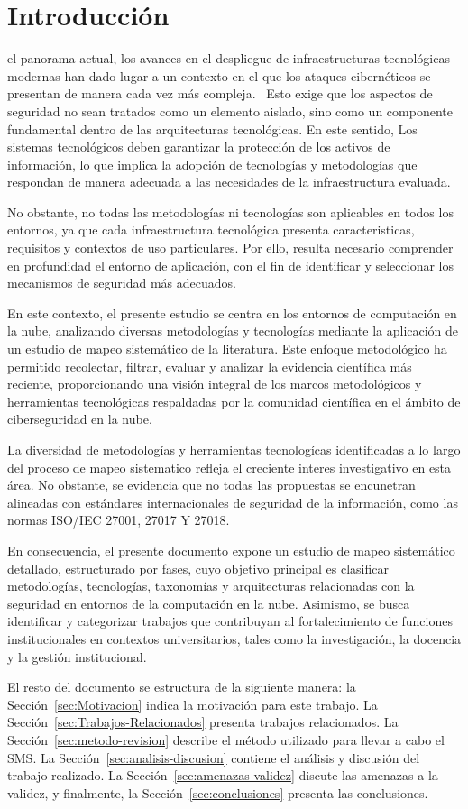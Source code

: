 \section{Introducción}
 el panorama actual, los avances en el despliegue de infraestructuras tecnológicas modernas han dado lugar a un 
contexto en el que los ataques cibernéticos se presentan de manera cada vez más compleja.~\cite{wef2026_complexity} Esto exige que los aspectos de seguridad 
no sean tratados como un elemento aislado, sino como un componente fundamental dentro de las arquitecturas tecnológicas. En este 
sentido, Los sistemas tecnológicos deben garantizar la protección de los activos de información, lo que implica la adopción de 
tecnologías y metodologías que respondan de manera adecuada a las necesidades de la infraestructura evaluada.~\cite{iso27001}

No obstante, no todas las metodologías ni tecnologías son aplicables en todos los entornos, ya que cada infraestructura tecnológica 
presenta caracteristicas, requisitos y contextos de uso particulares. Por ello, resulta necesario comprender en profundidad el 
entorno de aplicación, con el fin de identificar y seleccionar los mecanismos de seguridad más adecuados.~\cite{iso27001}

En este contexto, el presente estudio se centra en los entornos de computación en la nube, analizando diversas metodologías y 
tecnologías mediante la aplicación de un estudio de mapeo sistemático de la literatura. Este enfoque metodológico ha permitido 
recolectar, filtrar, evaluar y analizar la evidencia científica más reciente, proporcionando una visión integral de los marcos 
metodológicos y herramientas tecnológicas respaldadas por la comunidad científica en el ámbito de ciberseguridad en la nube.

La diversidad de metodologías y herramientas tecnologícas identificadas a lo largo del proceso de mapeo sistematico refleja el 
creciente interes investigativo en esta área. No obstante, se evidencia que no todas las propuestas se encunetran alineadas con 
estándares internacionales de seguridad de la información, como las normas ISO/IEC 27001, 27017 Y 27018. 

En consecuencia, el presente documento expone un estudio de mapeo sistemático detallado, estructurado por fases, cuyo objetivo 
principal es clasificar metodologías, tecnologías, taxonomías y arquitecturas relacionadas con la seguridad en entornos de la 
computación en la nube. Asimismo, se busca identificar y categorizar trabajos que contribuyan al fortalecimiento de funciones 
institucionales en contextos universitarios, tales como la investigación, la docencia y la gestión institucional.

El resto del documento se estructura de la siguiente manera:
la Sección~\ref{sec:Motivacion} indica la motivación para este trabajo.
La Sección~\ref{sec:Trabajos-Relacionados} presenta trabajos relacionados.
La Sección~\ref{sec:metodo-revision} describe el método utilizado para llevar a cabo el SMS.
La Sección~\ref{sec:analisis-discusion} contiene el análisis y discusión del trabajo realizado.
La Sección~\ref{sec:amenazas-validez} discute las amenazas a la validez, y finalmente,
la Sección~\ref{sec:conclusiones} presenta las conclusiones.